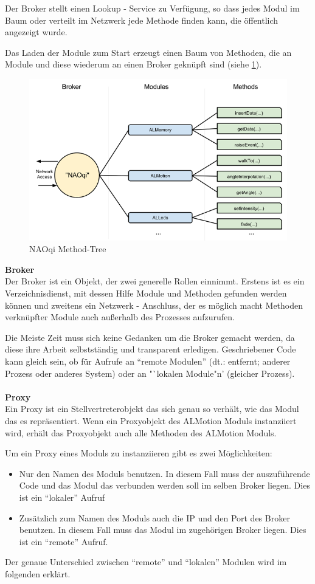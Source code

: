 Der Broker 	stellt einen Lookup - Service zu Verfügung, so dass jedes Modul im Baum oder verteilt im Netzwerk jede Methode finden kann, die öffentlich angezeigt wurde.

Das Laden der Module zum Start erzeugt einen Baum von Methoden, die an Module und diese wiederum an einen Broker geknüpft sind (siehe \ref{f:naoqi_broker2}).

\begin{figure}[H]						
	\centering							
	\includegraphics[scale=0.8]{Bilder/naoqi_process2.PNG}
	\caption{NAOqi Method-Tree}						
	\label{f:naoqi_broker2}						
\end{figure}
\noindent
\textbf{Broker}
\\
Der Broker ist ein Objekt, der zwei generelle Rollen einnimmt. Erstens ist es ein Verzeichnisdienst, mit dessen Hilfe Module und Methoden gefunden werden können und zweitens ein Netzwerk - Anschluss, der es möglich macht Methoden verknüpfter Module auch außerhalb des Prozesses aufzurufen.

Die Meiste Zeit muss sich keine Gedanken um die Broker gemacht werden, da diese ihre Arbeit selbstständig und transparent erledigen. Geschriebener Code kann gleich sein, ob für Aufrufe an "`remote Modulen"' (dt.: entfernt; anderer Prozess oder anderes System) oder an "`lokalen Module"n' (gleicher Prozess).
\\
\\
\textbf{Proxy}
\\
Ein Proxy ist ein Stellvertreterobjekt das sich genau so verhält, wie das Modul das es repräsentiert. Wenn ein Proxyobjekt des ALMotion Moduls instanziiert wird, erhält das Proxyobjekt auch alle Methoden des \textsf{ALMotion} Moduls.

Um ein Proxy eines Moduls zu instanziieren gibt es zwei Möglichkeiten: 
\begin{itemize}
\item Nur den Namen des Moduls benutzen. In diesem Fall muss der auszuführende Code und das Modul das verbunden werden soll im selben Broker liegen. Dies ist ein "`lokaler"' Aufruf
\item Zusätzlich zum Namen des Moduls auch die IP und den Port des Broker benutzen. In diesem Fall muss das Modul im zugehörigen Broker liegen. Dies ist ein "`remote"' Aufruf.
\end{itemize}
Der genaue Unterschied zwischen "`remote"' und "`lokalen"' Modulen wird im folgenden erklärt.
\\
